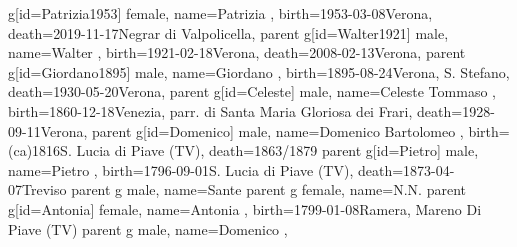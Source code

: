 \documentclass{article}
\begin{document}
\begin{midpage}
\begin{center}
\begin{genealogypicture}
{{        g[id=Patrizia1953]{
            female,
            name={Patrizia },
            birth={1953-03-08}{Verona},
            death={2019-11-17}{Negrar di Valpolicella},
        }
        parent{
            g[id=Walter1921]{
                male,
                name={Walter },
                birth={1921-02-18}{Verona},
                death={2008-02-13}{Verona},
            }
            parent{
                g[id=Giordano1895]{
                    male,
                    name={Giordano },
                    birth={1895-08-24}{Verona, S. Stefano},
                    death={1930-05-20}{Verona},
                }
                parent{
                    g[id=Celeste]{
                        male,
                        name={Celeste Tommaso },
                        birth={1860-12-18}{Venezia, parr. di Santa Maria Gloriosa dei Frari},
                        death={1928-09-11}{Verona},
                    }
                    parent{
                        g[id=Domenico]{
                            male,
                            name={Domenico Bartolomeo },
                            birth={(ca)1816}{S. Lucia di Piave (TV)},
                            death={1863/1879}{}
                        }
                        parent{
                            g[id=Pietro]{
                                male,
                                name={Pietro },
                                birth={1796-09-01}{S. Lucia di Piave (TV)},
                                death={1873-04-07}{Treviso}
                            }
                            parent{
                                g{
                                    male,
                                    name={Sante }
                                }
                            }
                            parent{
                                g{
                                    female,
                                    name={N.N.}
                                }
                            }
                        }
                        parent{
                            g[id=Antonia]{
                                female,
                                name={Antonia },
                                birth={1799-01-08}{Ramera, Mareno Di Piave (TV)}
                            }
                            parent{
                                g{
                                    male,
                                    name={Domenico },
}}}}}}}}}
\end{genealogypicture}
\end{center}
\end{midpage}
\end{document}
